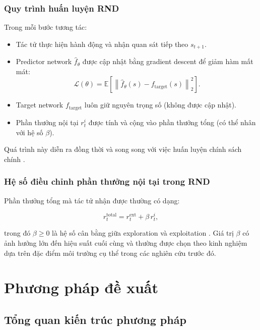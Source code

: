 \documentclass{uetgraduation}
\begin{document}
\subsection{Quy trình huấn luyện RND}

Trong mỗi bước tương tác:

\begin{itemize}
    \item Tác tử thực hiện hành động và nhận quan sát tiếp theo $s_{t+1}$.
    \item Predictor network $\hat{f}_{\theta}$ được cập nhật bằng gradient descent để giảm hàm mất mát:
    \[
    \mathcal{L}(\theta) = \mathbb{E} \left[ \left\| \hat{f}_{\theta}(s) - f_{\text{target}}(s) \right\|_2^2 \right].
    \]
    \item Target network $f_{\text{target}}$ luôn giữ nguyên trọng số (không được cập nhật).
    \item Phần thưởng nội tại $r_t^i$ được tính và cộng vào phần thưởng tổng (có thể nhân với hệ số $\beta$).
\end{itemize}

Quá trình này diễn ra đồng thời và song song với việc huấn luyện chính sách chính \cite{burda2019}.

\subsection{Hệ số điều chỉnh phần thưởng nội tại trong RND}

Phần thưởng tổng mà tác tử nhận được thường có dạng:

\[
r_t^{\text{total}} = r_t^{\text{ext}} + \beta \, r_t^i,
\]

trong đó $\beta \geq 0$ là hệ số cân bằng giữa exploration và exploitation \cite{burda2019}. Giá trị $\beta$ có ảnh hưởng lớn đến hiệu suất cuối cùng và thường được chọn theo kinh nghiệm dựa trên đặc điểm môi trường cụ thể trong các nghiên cứu trước đó.

\chapter{Phương pháp đề xuất}

\section{Tổng quan kiến trúc phương pháp}\label{sec:overview}
\end{document}
